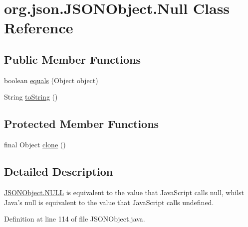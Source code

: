 \hypertarget{classorg_1_1json_1_1_j_s_o_n_object_1_1_null}{\section{org.\-json.\-J\-S\-O\-N\-Object.\-Null Class Reference}
\label{classorg_1_1json_1_1_j_s_o_n_object_1_1_null}
}
\subsection*{Public Member Functions}
\begin{DoxyCompactItemize}
\item 
boolean \hyperlink{classorg_1_1json_1_1_j_s_o_n_object_1_1_null_afb93b80d80add10c24d8beb3ce0cd4d1}{equals} (Object object)
\item 
String \hyperlink{classorg_1_1json_1_1_j_s_o_n_object_1_1_null_a7bf57f48fd3504fc840325dcf1ea9852}{to\-String} ()
\end{DoxyCompactItemize}
\subsection*{Protected Member Functions}
\begin{DoxyCompactItemize}
\item 
final Object \hyperlink{classorg_1_1json_1_1_j_s_o_n_object_1_1_null_a884e43af036f023f03386837ccd5603f}{clone} ()
\end{DoxyCompactItemize}


\subsection{Detailed Description}
\hyperlink{classorg_1_1json_1_1_j_s_o_n_object_a01c74a31a1abfd34ab13beb9347855ac}{J\-S\-O\-N\-Object.\-N\-U\-L\-L} is equivalent to the value that Java\-Script calls null, whilst Java's null is equivalent to the value that Java\-Script calls undefined. 

Definition at line 114 of file J\-S\-O\-N\-Object.\-java.




